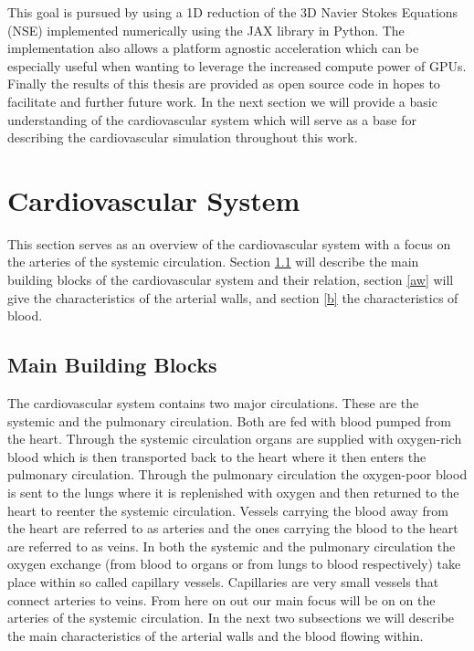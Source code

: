 \documentclass[a4paper, oneside]{discothesis}
\begin{document}
This goal is pursued by using a 1D reduction of the 3D Navier Stokes Equations (NSE) implemented numerically using the JAX library in Python.
The implementation also allows a platform agnostic acceleration which can be especially useful when wanting to leverage the increased compute power of GPUs.
Finally the results of this thesis are provided as open source code in hopes to facilitate and further future work.
In the next section we will provide a basic understanding of the cardiovascular system which will serve as a base for describing the cardiovascular simulation throughout this work.




\chapter{Cardiovascular System}
This section serves as an overview of the cardiovascular system with a focus on the arteries of the systemic circulation. 
Section \ref{mbb} will describe the main building blocks of the cardiovascular system and their relation, section \ref{aw} will give the characteristics of the arterial walls, and section \ref{b} the characteristics of blood.
\section{Main Building Blocks} \label{mbb}
The cardiovascular system contains two major circulations.
These are the systemic and the pulmonary circulation. 
Both are fed with blood pumped from the heart.
Through the systemic circulation organs are supplied with oxygen-rich blood which is then transported back to the heart where it then enters the pulmonary circulation.
Through the pulmonary circulation the oxygen-poor blood is sent to the lungs where it is replenished with oxygen and then returned to the heart to reenter the systemic circulation.
Vessels carrying the blood away from the heart are referred to as arteries and the ones carrying the blood to the heart are referred to as veins.
In both the systemic and the pulmonary circulation the oxygen exchange (from blood to organs or from lungs to blood respectively) take place within so called capillary vessels.
Capillaries are very small vessels that connect arteries to veins.
From here on out our main focus will be on on the arteries of the systemic circulation. 
In the next two subsections we will describe the main characteristics of the arterial walls and the blood flowing within.
\end{document}
